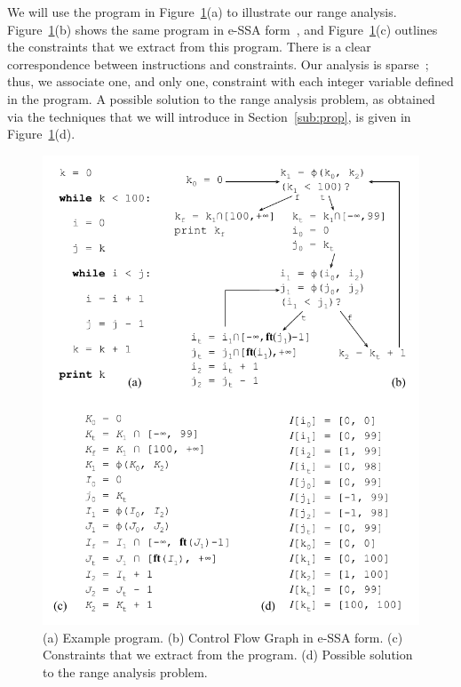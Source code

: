 \documentclass{sigplanconf}[10pt]
\begin{document}
We will use the program in Figure~\ref{fig:ex_eSSA_cgo}(a) to illustrate our
range analysis.
Figure~\ref{fig:ex_eSSA_cgo}(b) shows the same program in e-SSA
form~\cite{Bodik00},
and Figure~\ref{fig:ex_eSSA_cgo}(c) outlines the constraints that we extract
from this program.
There is a clear correspondence between instructions and constraints.
Our analysis is sparse~\cite{Choi91}; thus, we associate one, and only one,
constraint with each integer variable defined in the program.
A possible solution to the range analysis problem, as obtained via the
techniques that we will introduce in Section~\ref{sub:prop}, is given in
Figure~\ref{fig:ex_eSSA_cgo}(d).

\begin{figure}[t!]
\begin{center}
\includegraphics[width=\columnwidth]{images/ex_eSSA_cgo}
\end{center}
\caption{\label{fig:ex_eSSA_cgo}
(a) Example program.
(b) Control Flow Graph in e-SSA form.
(c) Constraints that we extract from the program.
(d) Possible solution to the range analysis problem.}
\end{figure}
\end{document}
